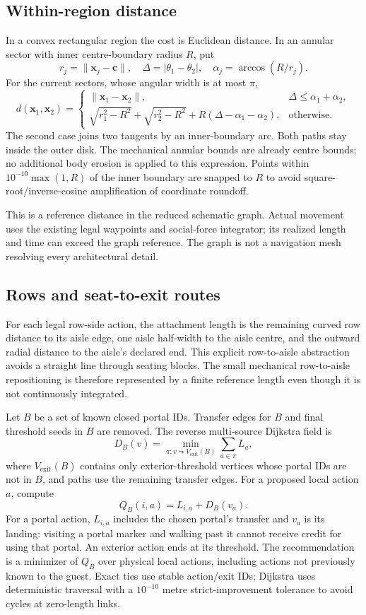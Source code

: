\documentclass[11pt]{article}
\begin{document}
\subsection{Within-region distance}
In a convex rectangular region the cost is Euclidean distance. In an annular
sector with inner centre-boundary radius $R$, put
\[
 r_j=\|\mathbf x_j-\mathbf c\|,\quad
 \Delta=|\theta_1-\theta_2|,\quad
 \alpha_j=\arccos(R/r_j).
\]
For the current sectors, whose angular width is at most $\pi$,
\[
 d(\mathbf x_1,\mathbf x_2)=
 \begin{cases}
 \|\mathbf x_1-\mathbf x_2\|,&\Delta\leq\alpha_1+\alpha_2,\\
 \sqrt{r_1^2-R^2}+\sqrt{r_2^2-R^2}
       +R(\Delta-\alpha_1-\alpha_2),&\text{otherwise}.
 \end{cases}
\]
The second case joins two tangents by an inner-boundary arc. Both paths stay
inside the outer disk. The mechanical annular bounds are already centre
bounds; no additional body erosion is applied to this expression. Points
within $10^{-10}\max(1,R)$ of the inner boundary are snapped to $R$ to avoid
square-root/inverse-cosine amplification of coordinate roundoff.

This is a reference distance in the reduced schematic graph. Actual movement
uses the existing legal waypoints and social-force integrator; its realized
length and time can exceed the graph reference. The graph is not a navigation
mesh resolving every architectural detail.

\subsection{Rows and seat-to-exit routes}
For each legal row-side action, the attachment length is the remaining curved
row distance to its aisle edge, one aisle half-width to the aisle centre, and
the outward radial distance to the aisle's declared end. This explicit
row-to-aisle abstraction avoids a straight line through seating blocks.
The small mechanical row-to-aisle repositioning is therefore represented by
a finite reference length even though it is not continuously integrated.

Let $B$ be a set of known closed portal IDs. Transfer edges for $B$ and final
threshold seeds in $B$ are removed. The reverse multi-source Dijkstra field is
\[
 D_B(v)=\min_{\pi:v\leadsto V_{\mathrm{exit}}(B)}\sum_{a\in\pi}L_a,
\]
where $V_{\mathrm{exit}}(B)$ contains only exterior-threshold vertices whose
portal IDs are not in $B$, and paths use the remaining transfer edges.
For a proposed local action $a$, compute
\[
 Q_B(i,a)=L_{i,a}+D_B(v_a).
\]
For a portal action, $L_{i,a}$ includes the chosen portal's transfer and
$v_a$ is its landing: visiting a portal marker and walking past it cannot
receive credit for using that portal. An exterior action ends at its threshold.
The recommendation is a minimizer of $Q_B$ over physical local actions,
including actions not previously known to the guest. Exact ties use stable
action/exit IDs; Dijkstra uses deterministic traversal with a $10^{-10}$ metre
strict-improvement tolerance to avoid cycles at zero-length links.
\end{document}
